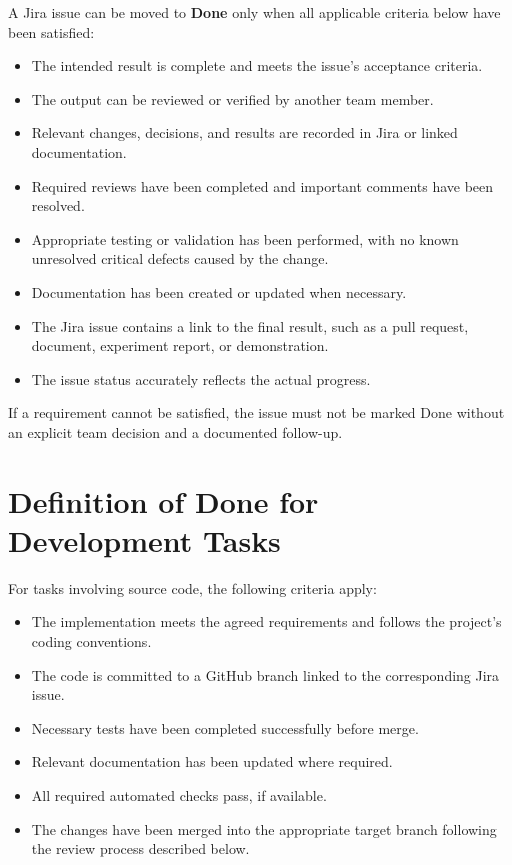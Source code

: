 \documentclass[12pt,a4paper]{article}
\begin{document}
A Jira issue can be moved to \textbf{Done} only when all applicable criteria
below have been satisfied:

\begin{itemize}
    \item The intended result is complete and meets the issue's acceptance
          criteria.
    \item The output can be reviewed or verified by another team member.
    \item Relevant changes, decisions, and results are recorded in Jira or
          linked documentation.
    \item Required reviews have been completed and important comments
          have been resolved.
    \item Appropriate testing or validation has been performed, with no
          known unresolved critical defects caused by the change.
    \item Documentation has been created or updated when necessary.
    \item The Jira issue contains a link to the final result, such as a
          pull request, document, experiment report, or demonstration.
    \item The issue status accurately reflects the actual progress.
\end{itemize}

If a requirement cannot be satisfied, the issue must not be marked Done
without an explicit team decision and a documented follow-up.

\section{Definition of Done for Development Tasks}

For tasks involving source code, the following criteria apply:

\begin{itemize}
    \item The implementation meets the agreed requirements
          and follows the project's coding conventions.
    \item The code is committed to a GitHub branch linked
          to the corresponding Jira issue.
    \item Necessary tests have been completed successfully before merge.
    \item Relevant documentation has been updated
          where required.
    \item All required automated checks pass, if available.
    \item The changes have been merged into the appropriate
          target branch following the review process
          described below.
\end{itemize}
\end{document}
